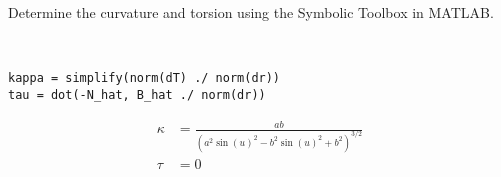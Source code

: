 Determine the curvature and torsion using the Symbolic Toolbox in MATLAB.

\begin{solution} \
\begin{lstlisting}
kappa = simplify(norm(dT) ./ norm(dr))  
tau = dot(-N_hat, B_hat ./ norm(dr))
\end{lstlisting}

\begin{align*}
    \kappa &= \frac{a b}{\left(a^{2} \sin (u)^{2}-b^{2} \sin (u)^{2}+b^{2}\right)^{3 / 2}} \\
    \tau &= 0
\end{align*}
\end{solution}